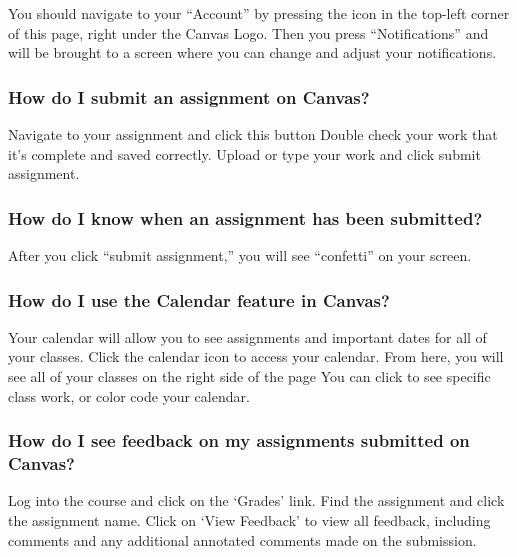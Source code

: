 \documentclass[
]{book}
\begin{document}
You should navigate to your ``Account'' by pressing the icon in the top-left corner of this page, right under the Canvas Logo. Then you press ``Notifications'' and will be brought to a screen where you can change and adjust your notifications.

\hypertarget{how-do-i-submit-an-assignment-on-canvas}{%
\subsubsection{How do I submit an assignment on Canvas?}\label{how-do-i-submit-an-assignment-on-canvas}}

Navigate to your assignment and click this button
Double check your work that it's complete and saved correctly.
Upload or type your work and click submit assignment.

\hypertarget{how-do-i-know-when-an-assignment-has-been-submitted}{%
\subsubsection{How do I know when an assignment has been submitted?}\label{how-do-i-know-when-an-assignment-has-been-submitted}}

After you click ``submit assignment,'' you will see ``confetti'' on your screen.

\hypertarget{how-do-i-use-the-calendar-feature-in-canvas}{%
\subsubsection{How do I use the Calendar feature in Canvas?}\label{how-do-i-use-the-calendar-feature-in-canvas}}

Your calendar will allow you to see assignments and important dates for all of your classes.
Click the calendar icon to access your calendar.
From here, you will see all of your classes on the right side of the page
You can click to see specific class work, or color code your calendar.

\hypertarget{how-do-i-see-feedback-on-my-assignments-submitted-on-canvas}{%
\subsubsection{How do I see feedback on my assignments submitted on Canvas?}\label{how-do-i-see-feedback-on-my-assignments-submitted-on-canvas}}

Log into the course and click on the `Grades' link.
Find the assignment and click the assignment name.
Click on `View Feedback' to view all feedback, including comments and any additional annotated comments made on the submission.
\end{document}
